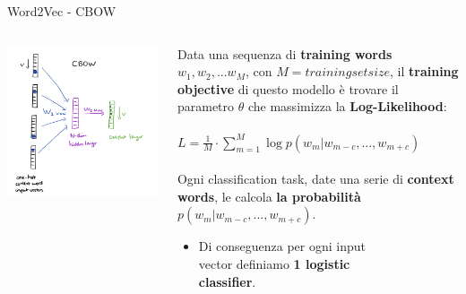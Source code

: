 \documentclass[british]{beamer}
\begin{document}
\begin{frame}{Word2Vec - CBOW}
	\begin{columns}
		\begin{column}{0.4\textwidth}
			\includegraphics[width=1.1\linewidth,height=1.4\textwidth]{./Imgs/cbow}
		\end{column}
		\begin{column}{0.6\textwidth}
			Data una sequenza di \textbf{training words} \(w_1, w_2, ... w_M\), con \(M = trainingsetsize\), il \textbf{training objective} di questo modello \`{e} trovare il parametro \(\theta\) che massimizza la \textbf{Log-Likelihood}:
			\\~\\
			\(L = \frac{1}{M}\cdot\sum_{m=1}^{M}\log p(w_{m}|w_{m-c}, ... , w_{m+c})\)
			\\~\\
			Ogni classification task, date una serie di \textbf{context words}, le  calcola \textbf{la probabilit\`{a}} \(p(w_{m}|w_{m-c}, ... , w_{m+c})\).
			\begin{itemize}
				\item Di conseguenza per ogni input\\ vector definiamo \textbf{1 logistic\\ classifier}.
			\end{itemize}
		\end{column}
	\end{columns}
\end{frame}
\end{document}
